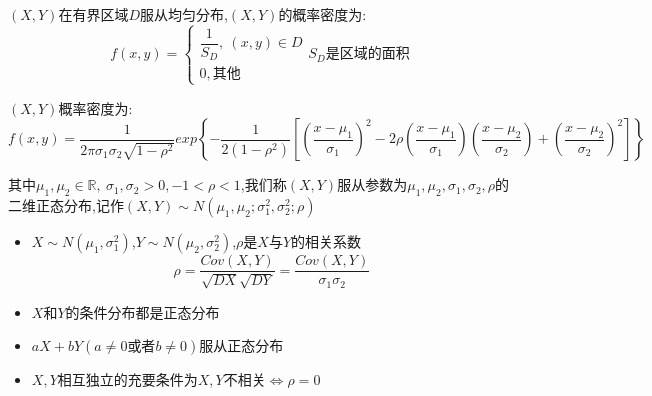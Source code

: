 \begin{definition}[常见二维分布]
	
	$(X,Y)$在有界区域$D$服从均匀分布,$(X,Y)$的概率密度为: 
	$$f(x,y)=\left\lbrace 
	\begin{array}{l}
		\dfrac{1}{S_{D}},\ (x,y)\in D\\
		0,\text{其他}
	\end{array}
	\right. S_{D}\text{是区域的面积}$$
	
	
	$(X,Y)$概率密度为: 
	$$f(x,y)=\dfrac{1}{2\pi\sigma_{1}\sigma_{2}\sqrt{1-\rho^2}}exp\left\lbrace -\dfrac{1}{2(1-\rho^2)}\left[ \left( \dfrac{x-\mu_{1}}{\sigma_{1}}\right)^2-2\rho\left( \dfrac{x-\mu_{1}}{\sigma_{1}}\right)\left( \dfrac{x-\mu_{2}}{\sigma_{2}}\right) +\left( \dfrac{x-\mu_{2}}{\sigma_{2}}\right)^2\right] \right\rbrace $$
	
	其中$\mu_{1},\mu_{2}\in\mathbb{R},\ \sigma_{1},\sigma_{2}>0,-1<\rho<1$,我们称$(X,Y)$服从参数为$\mu_{1},\mu_{2},\sigma_{1},\sigma_{2},\rho$的二维正态分布,记作$(X,Y)\sim N(\mu_{1},\mu_{2};\sigma_{1}^2,\sigma_{2}^2;\rho)$
	
	\begin{anymark}[注]
		\begin{itemize}
			\item  $X\sim N(\mu_{1},\sigma_{1}^2)$,$Y\sim N(\mu_{2},\sigma_{2}^2)$,$\rho$是$X$与$Y$的相关系数
			$$\rho=\dfrac{Cov(X,Y)}{\sqrt{DX}\sqrt{DY}}=\dfrac{Cov(X,Y)}{\sigma_{1}\sigma_{2}}$$
			\item $X$和$Y$的条件分布都是正态分布
			\item $aX+bY(a\neq 0\text{或者}b\neq 0)$服从正态分布
			\item $X,Y$相互独立的充要条件为$X,Y$不相关$\Leftrightarrow \rho=0$
		\end{itemize}
	\end{anymark}
\end{definition}
